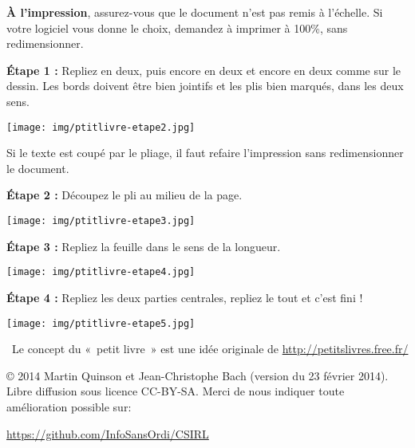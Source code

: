 \documentclass[a4paper,12pt]{article}
\begin{document}
\noindent
\begin{minipage}[b]{.45\linewidth}

\noindent\textbf{À l'impression}, assurez-vous que le document n'est
pas remis à l'échelle. Si votre logiciel vous donne le choix, demandez
à imprimer à 100\%, sans redimensionner.

\bigskip %
\bigskip %
\noindent\textbf{Étape 1 :} Repliez en deux, puis encore en deux et
encore en deux comme sur le dessin. Les bords doivent être bien
jointifs et les plis bien marqués, dans les deux sens.


\medskip \centerline{\texttt{[image: img/ptitlivre-etape2.jpg]}}

Si le texte est coupé par le pliage, il faut refaire l'impression sans
redimensionner le document.

\medskip

\end{minipage}\hfill\begin{minipage}[b]{.45\linewidth}
\noindent\textbf{Étape 2 :} Découpez le pli au milieu de la page.

\medskip %
\centerline{\texttt{[image: img/ptitlivre-etape3.jpg]}}
 
\bigskip %
\noindent\textbf{Étape 3 :} Repliez la feuille dans le sens de la longueur.\\

\centerline{\texttt{[image: img/ptitlivre-etape4.jpg]}}
  
\bigskip

\noindent
\begin{minipage}{.6\linewidth}
\noindent\textbf{Étape 4 :} Repliez les deux parties centrales, repliez
le tout et c'est fini !
\end{minipage}\hfill%
\begin{minipage}{.35\linewidth}
  \texttt{[image: img/ptitlivre-etape5.jpg]}
\end{minipage}

\bigskip
\end{minipage}

\bigskip~\hfill{\small Le concept du «~petit livre~» est une idée
  originale de {\color{blue}\url{http://petitslivres.free.fr/}}}
  
\bigskip \bigskip \bigskip \normalsize %
\noindent\copyright{} 2014 Martin Quinson et Jean-Christophe Bach
(version du 23 février 2014). \\ Libre diffusion sous licence
CC-BY-SA. Merci de nous indiquer toute amélioration possible sur:

\centerline{\color{blue}\url{https://github.com/InfoSansOrdi/CSIRL}}
\end{document}
